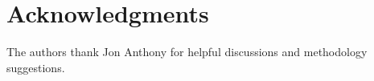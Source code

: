 \documentclass[12pt]{article}
\begin{document}
\section{Acknowledgments} 
The authors thank Jon Anthony for helpful discussions and methodology suggestions. 




%
%




%  
%
%










\end{document}

